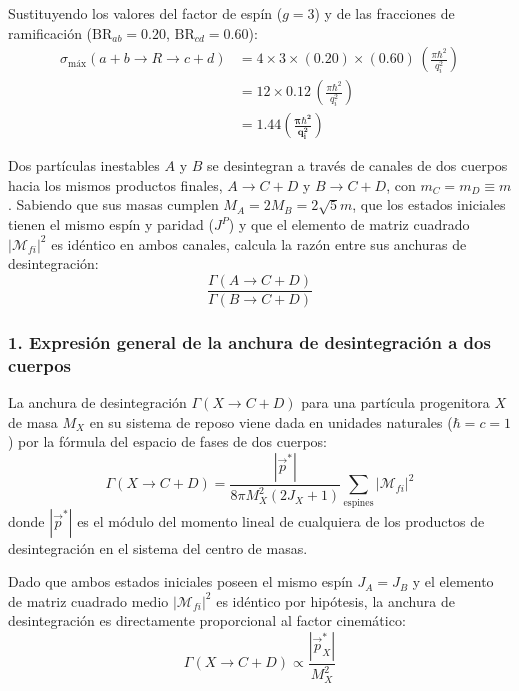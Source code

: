 \begin{problema}
Sustituyendo los valores del factor de espín ($g = 3$) y de las fracciones de ramificación ($\text{BR}_{ab} = 0.20$, $\text{BR}_{cd} = 0.60$):
\begin{align*}
\sigma_{\text{máx}}(a+b \to R \to c+d) &= 4 \times 3 \times (0.20) \times (0.60) \, \left( \frac{\pi \hbar^2}{q_i^2} \right) \\
&= 12 \times 0.12 \, \left( \frac{\pi \hbar^2}{q_i^2} \right) \\
&= \mathbf{1.44 \left( \frac{\pi \hbar^2}{q_i^2} \right)}
\end{align*}
\end{problema}
\newpage
\begin{problema}
Dos partículas inestables $A$ y $B$ se desintegran a través de canales de dos cuerpos hacia los mismos productos finales, $A \longrightarrow C + D$ y $B \longrightarrow C + D$, con $m_C = m_D \equiv m$. Sabiendo que sus masas cumplen $M_A = 2 M_B = 2\sqrt{5} m$, que los estados iniciales tienen el mismo espín y paridad ($J^P$) y que el elemento de matriz cuadrado $|\mathcal{M}_{fi}|^2$ es idéntico en ambos canales, calcula la razón entre sus anchuras de desintegración:
\begin{equation*}
\frac{\Gamma(A \rightarrow C + D)}{\Gamma(B \rightarrow C + D)}
\end{equation*}

\tcblower

\subsubsection*{1. Expresión general de la anchura de desintegración a dos cuerpos}

La anchura de desintegración $\Gamma(X \rightarrow C + D)$ para una partícula progenitora $X$ de masa $M_X$ en su sistema de reposo viene dada en unidades naturales ($\hbar = c = 1$) por la fórmula del espacio de fases de dos cuerpos:
\begin{equation*}
\Gamma(X \rightarrow C + D) = \frac{|\vec{p}^*|}{8 \pi M_X^2 (2J_X + 1)} \sum_{\text{espines}} |\mathcal{M}_{fi}|^2
\end{equation*}
donde $|\vec{p}^*|$ es el módulo del momento lineal de cualquiera de los productos de desintegración en el sistema del centro de masas.

Dado que ambos estados iniciales poseen el mismo espín $J_A = J_B$ y el elemento de matriz cuadrado medio $|\mathcal{M}_{fi}|^2$ es idéntico por hipótesis, la anchura de desintegración es directamente proporcional al factor cinemático:
\begin{equation*}
\Gamma(X \rightarrow C + D) \propto \frac{|\vec{p}^*_X|}{M_X^2}
\end{equation*}


\end{problema}
